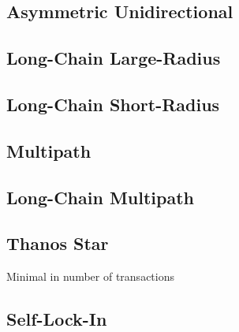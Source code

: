 \documentclass{article}
\begin{document}
\subsection*{Asymmetric Unidirectional}

\subsection*{Long-Chain Large-Radius}
\subsection*{Long-Chain Short-Radius}
\subsection*{Multipath}
\subsection*{Long-Chain Multipath}
\subsection*{Thanos Star}

Minimal in number of transactions

\subsection*{Self-Lock-In}
\end{document}
